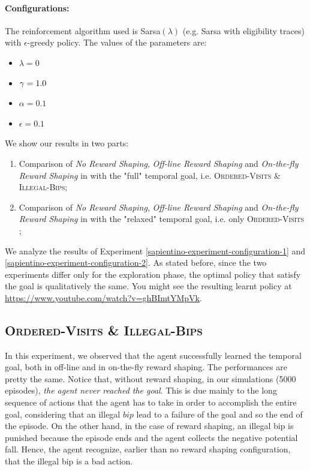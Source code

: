 \paragraph{Configurations:}
The reinforcement algorithm used is Sarsa$(\lambda)$ (e.g. Sarsa with eligibility traces) with $\epsilon$-greedy policy. The values of the parameters are:
\begin{itemize}
	\item $\lambda = 0$
	\item $\gamma=1.0$	
	\item $\alpha=0.1$
	\item $\epsilon= 0.1$
\end{itemize}

\medskip


We show our results in two parts:
\begin{enumerate}
	\item Comparison of \emph{No Reward Shaping}, \emph{Off-line Reward Shaping} and \emph{On-the-fly Reward Shaping} in \Sapientino with the "full" temporal goal, i.e. \textsc{Ordered-Visits \& Illegal-Bips}\label{sapientino-experiment-configuration-1};
	\item Comparison of \emph{No Reward Shaping}, \emph{Off-line Reward Shaping} and \emph{On-the-fly Reward Shaping} in \Sapientino with the "relaxed" temporal goal, i.e. only \textsc{Ordered-Visits} \label{sapientino-experiment-configuration-2};
\end{enumerate}


We analyze the results of Experiment \ref{sapientino-experiment-configuration-1} and \ref{sapientino-experiment-configuration-2}. As stated before, since the two experiments differ only for the exploration phase, the optimal policy that satisfy the goal is qualitatively the same. You might see the resulting learnt policy at \url{https://www.youtube.com/watch?v=ghBImtYMpVk}.

\subsection{\textsc{Ordered-Visits \& Illegal-Bips}}
In this experiment, we observed that the agent successfully learned the temporal goal, both in off-line and in on-the-fly reward shaping. The performances are pretty the same. Notice that, without reward shaping, in our simulations (5000 episodes), \emph{the agent never reached the goal}.
This is due mainly to the long sequence of actions that the agent has to take in order to accomplish the entire goal, considering that an illegal $bip$ lead to a failure of the goal and so the end of the episode. On the other hand, in the case of reward shaping, an illegal bip is punished because the episode ends and the agent collects the negative potential fall. Hence, the agent recognize, earlier than no reward shaping configuration, that the illegal bip is a bad action.
